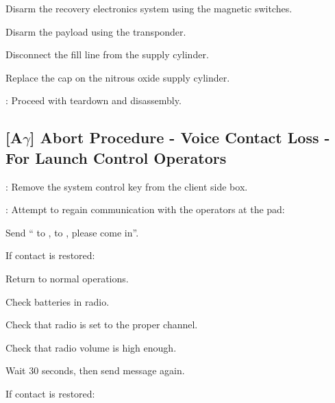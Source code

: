 \begin{checklist}
\begin{checklist}
\begin{checklist}
            \item Disarm the recovery electronics system using the magnetic switches.
            \item Disarm the payload using the transponder.
            \item Disconnect the fill line from the supply cylinder.
            \item Replace the cap on the nitrous oxide supply cylinder.
        \end{checklist}
    \item \ops{}: Proceed with teardown and disassembly.
\end{checklist}
\setcounter{checklistnum}{0}

\subsection{[A{\LARGE$\gamma$}] Abort Procedure - Voice Contact Loss - For Launch Control Operators}
\begin{checklist}
    \item \control{}: Remove the system control key from the client side box.
    \item \ops{}: Attempt to regain communication with the operators at the pad:
    \begin{checklist}
        \item Send ``\ops{} to \secondary{}, \ops{} to \secondary{}, \secondary{} please come in''.
        \begin{checklist}[label=$\bullet$]
            \item If contact is restored:
            \begin{checklist}
                \item Return to normal operations.
            \end{checklist}
        \end{checklist}
        \item Check batteries in radio.
        \item Check that radio is set to the proper channel.
        \item Check that radio volume is high enough.
        \item Wait 30 seconds, then send message again.
        \begin{checklist}[label=$\bullet$]
            \item If contact is restored:
            \begin{checklist}

\end{checklist}
\end{checklist}
\end{checklist}
\end{checklist}
\end{checklist}
